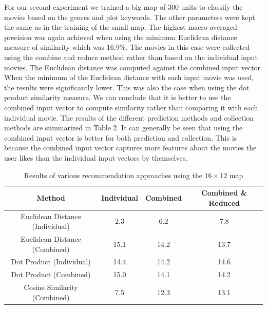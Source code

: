 \documentclass[conference]{IEEEtran}
\begin{document}
For our second experiment we trained a big map of 300 units to classify the movies based on the genres and plot keywords. The other parameters were kept the same as in the training of the small map. The highest macro-averaged precision was again achieved when using the minimum Euclidean distance measure of similarity which was 16.9\%. The movies in this case were collected using the combine and reduce method rather than based on the individual input movies. The Euclidean distance was computed against the combined input vector. When the minimum of the Euclidean distance with each input movie was used, the results were significantly lower. This was also the case when using the dot product similarity measure. We can conclude that it is better to use the combined input vector to compute similarity rather than comparing it with each individual movie. The results of the different prediction methods and collection methods are summarized in Table 2. It can generally be seen that using the combined input vector is better for both prediction and collection. This is because the combined input vector captures more features about the movies the user likes than the individual input vectors by themselves.

\begin{table}[htpb]
\begin{tabular}{c||c|c|c}
Method                          & Individual & Combined & Combined \& Reduced \\
\hline
Euclidean Distance (Individual) & 2.3        & 6.2      & 7.8                  \\
Euclidean Distance (Combined)   & 15.1       & 14.2     & 13.7                 \\
Dot Product (Individual)        & 14.4       & 14.2     & 14.6                 \\
Dot Product (Combined)          & 15.0       & 14.1     & 14.2                 \\
Cosine Similarity (Combined)    & 7.5        & 12.3     & 13.1                
\end{tabular}
\\
\caption{Results of various recommendation approaches using the $16 \times 12$ map}
\end{table}
\end{document}
